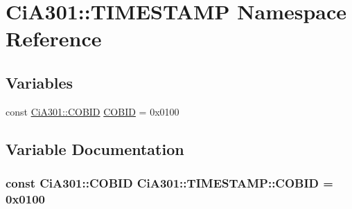 \hypertarget{namespace_ci_a301_1_1_t_i_m_e_s_t_a_m_p}{\section{Ci\-A301\-:\-:T\-I\-M\-E\-S\-T\-A\-M\-P Namespace Reference}
\label{namespace_ci_a301_1_1_t_i_m_e_s_t_a_m_p}
}
\subsection*{Variables}
\begin{DoxyCompactItemize}
\item 
const \hyperlink{namespace_ci_a301_aec5b5dbb2b60d2837c60499f6f297aa7}{Ci\-A301\-::\-C\-O\-B\-I\-D} \hyperlink{namespace_ci_a301_1_1_t_i_m_e_s_t_a_m_p_a67ab74f38c31e9ad9f34261294bcb62f}{C\-O\-B\-I\-D} = 0x0100
\end{DoxyCompactItemize}


\subsection{Variable Documentation}
\hypertarget{namespace_ci_a301_1_1_t_i_m_e_s_t_a_m_p_a67ab74f38c31e9ad9f34261294bcb62f}{
\subsubsection[{C\-O\-B\-I\-D}]{\setlength{\rightskip}{0pt plus 5cm}const {\bf Ci\-A301\-::\-C\-O\-B\-I\-D} Ci\-A301\-::\-T\-I\-M\-E\-S\-T\-A\-M\-P\-::\-C\-O\-B\-I\-D = 0x0100}}\label{namespace_ci_a301_1_1_t_i_m_e_s_t_a_m_p_a67ab74f38c31e9ad9f34261294bcb62f}

